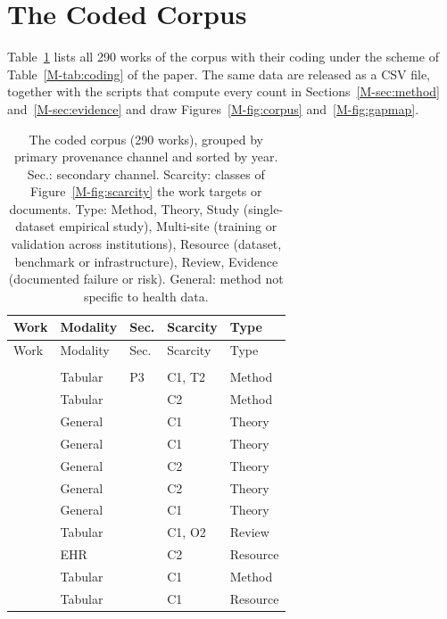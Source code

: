 \section{The Coded Corpus}\label{sec:corpus}

Table~\ref{tab:corpus} lists all 290 works of the corpus with their coding under the scheme of Table~\ref{M-tab:coding} of the paper. The same data are released as a CSV file, together with the scripts that compute every count in Sections~\ref{M-sec:method} and~\ref{M-sec:evidence} and draw Figures~\ref{M-fig:corpus} and~\ref{M-fig:gapmap}.

{\scriptsize
\setlength{\tabcolsep}{4pt}
\renewcommand{\arraystretch}{0.95}
\begin{longtable}{@{}p{5.6cm}llll@{}}
\caption{The coded corpus (290 works), grouped by primary provenance channel and sorted by year. Sec.: secondary channel. Scarcity: classes of Figure~\ref{M-fig:scarcity} the work targets or documents. Type: Method, Theory, Study (single-dataset empirical study), Multi-site (training or validation across institutions), Resource (dataset, benchmark or infrastructure), Review, Evidence (documented failure or risk). General: method not specific to health data.}\label{tab:corpus}\\
\toprule
Work & Modality & Sec. & Scarcity & Type\\
\midrule
\endfirsthead
\toprule
Work & Modality & Sec. & Scarcity & Type\\
\midrule
\endhead
\bottomrule
\endfoot
\multicolumn{5}{@{}l}{\emph{P1 Pooling} (102)}\\
\citet{dersimonian1986meta} & Tabular & P3 & C1, T2 & Method\\
\citet{sweeney2002k} & Tabular &  & C2 & Method\\
\citet{xiao2004fast} & General &  & C1 & Theory\\
\citet{boyd2006randomized} & General &  & C1 & Theory\\
\citet{dwork2006calibrating} & General &  & C2 & Theory\\
\citet{gentry2009fully} & General &  & C2 & Theory\\
\citet{nedic2009distributed} & General &  & C1 & Theory\\
\citet{riley2010meta} & Tabular &  & C1, O2 & Review\\
\citet{overhage2012validation} & EHR &  & C2 & Resource\\
\citet{wu2012grid} & Tabular &  & C1 & Method\\
\citet{jiang2013webglore} & Tabular &  & C1 & Resource\\

\end{longtable}}
